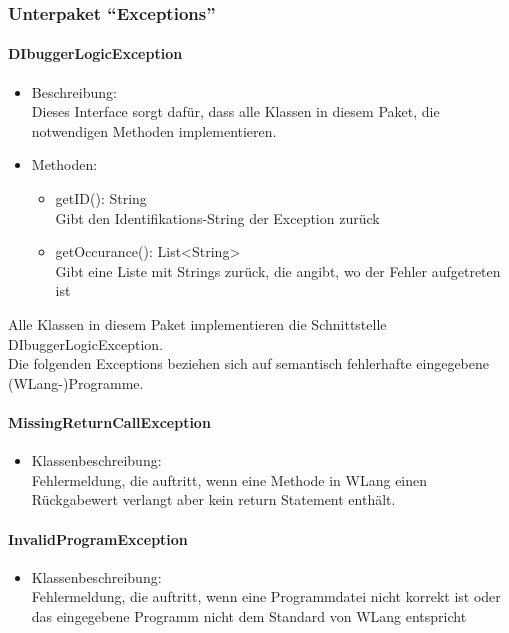 \documentclass[parskip=full]{scrartcl}
\begin{document}
\subsubsection{Unterpaket \enquote{Exceptions}}

\paragraph{DIbuggerLogicException}
\begin{itemize}
\item Beschreibung: \\
Dieses Interface sorgt dafür, dass alle Klassen in diesem Paket, die notwendigen Methoden implementieren.
\item Methoden: \\
\begin{itemize}
\item getID(): String \\
Gibt den Identifikations-String der Exception zurück
\item getOccurance(): List<String> \\
Gibt eine Liste mit Strings zurück, die angibt, wo der Fehler aufgetreten ist
\end{itemize}
\end{itemize}

Alle Klassen in diesem Paket implementieren die Schnittstelle DIbuggerLogicException. \\
Die folgenden Exceptions beziehen sich auf semantisch fehlerhafte eingegebene (WLang-)Programme.
\paragraph{MissingReturnCallException}
\begin{itemize}
\item Klassenbeschreibung: \\
Fehlermeldung, die auftritt, wenn eine Methode in WLang einen Rückgabewert verlangt aber kein return Statement enthält.
\end{itemize}

\paragraph{InvalidProgramException}
\begin{itemize}
\item Klassenbeschreibung: \\
Fehlermeldung, die auftritt, wenn eine Programmdatei nicht korrekt ist oder das eingegebene Programm nicht dem Standard von WLang entspricht
\end{itemize}
\end{document}
